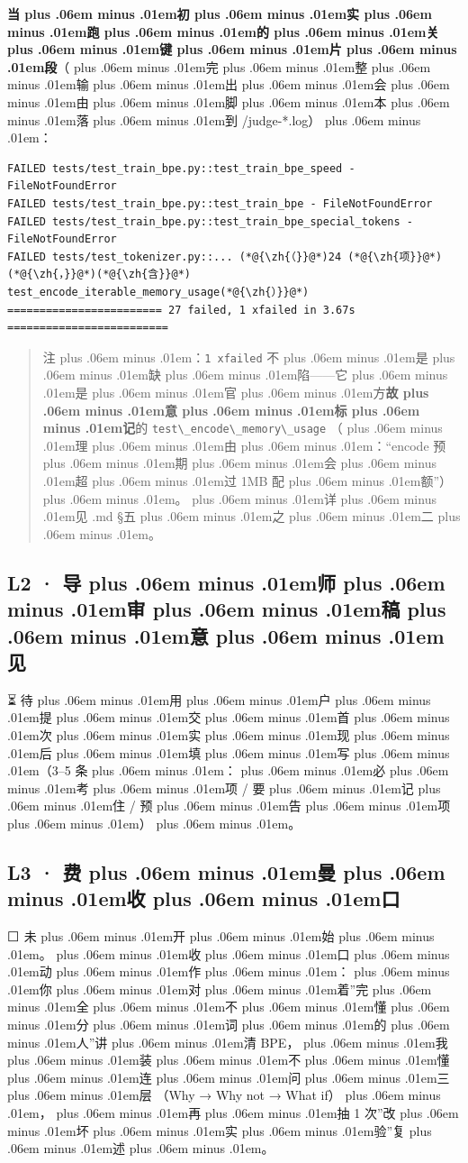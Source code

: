 \documentclass[
]{article}
\newcommand{\passthrough}[1]{#1}
\def\zh#1{{\zhfont #1}}
\def\sym#1{{\symfont #1}}
\def\emo#1{{\emofont #1}}
\def\codezh#1{{\zhmonofont #1}}
\def\zhglue{\hskip0pt plus .06em minus .01em}
\begin{document}
\textbf{\zh{当\zhglue 初\zhglue 实\zhglue 跑\zhglue 的\zhglue 关\zhglue 键\zhglue 片\zhglue 段}}\zh{（\zhglue 完\zhglue 整\zhglue 输\zhglue 出\zhglue 会\zhglue 由\zhglue 脚\zhglue 本\zhglue 落\zhglue 到} \passthrough{\codezh{{\zh{证}}{\zh{据}}/judge-*.log}}\zh{）\zhglue ：}

\begin{lstlisting}
FAILED tests/test_train_bpe.py::test_train_bpe_speed - FileNotFoundError
FAILED tests/test_train_bpe.py::test_train_bpe - FileNotFoundError
FAILED tests/test_train_bpe.py::test_train_bpe_special_tokens - FileNotFoundError
FAILED tests/test_tokenizer.py::... (*@{\zh{（}}@*)24 (*@{\zh{项}}@*)(*@{\zh{，}}@*)(*@{\zh{含}}@*) test_encode_iterable_memory_usage(*@{\zh{）}}@*)
======================== 27 failed, 1 xfailed in 3.67s =========================
\end{lstlisting}

\begin{quote}
\zh{注\zhglue ：}\passthrough{\lstinline!1 xfailed!} \zh{不\zhglue 是\zhglue 缺\zhglue 陷}------\zh{它\zhglue 是\zhglue 官\zhglue 方}\textbf{\zh{故\zhglue 意\zhglue 标\zhglue 记}}\zh{的} \passthrough{\lstinline!test\_encode\_memory\_usage!} \zh{（\zhglue 理\zhglue 由\zhglue ：}``encode \zh{预\zhglue 期\zhglue 会\zhglue 超\zhglue 过} 1MB \zh{配\zhglue 额}''\zh{）\zhglue 。\zhglue 详\zhglue 见} \passthrough{\codezh{{\zh{开}}{\zh{题}}{\zh{简}}{\zh{报}}.md}} \sym{§}\zh{五\zhglue 之\zhglue 二\zhglue 。}
\end{quote}

\subsection{L2 \sym{·} \zh{导\zhglue 师\zhglue 审\zhglue 稿\zhglue 意\zhglue 见}}\label{l2-ux5bfcux5e08ux5ba1ux7a3fux610fux89c1}

\emo{⏳} \zh{待\zhglue 用\zhglue 户\zhglue 提\zhglue 交\zhglue 首\zhglue 次\zhglue 实\zhglue 现\zhglue 后\zhglue 填\zhglue 写\zhglue （}3--5 \zh{条\zhglue ：\zhglue 必\zhglue 考\zhglue 项} / \zh{要\zhglue 记\zhglue 住} / \zh{预\zhglue 告\zhglue 项\zhglue ）\zhglue 。}

\subsection{L3 \sym{·} \zh{费\zhglue 曼\zhglue 收\zhglue 口}}\label{l3-ux8d39ux66fcux6536ux53e3}

\emo{⬜} \zh{未\zhglue 开\zhglue 始\zhglue 。\zhglue 收\zhglue 口\zhglue 动\zhglue 作\zhglue ：\zhglue 你\zhglue 对\zhglue 着}''\zh{完\zhglue 全\zhglue 不\zhglue 懂\zhglue 分\zhglue 词\zhglue 的\zhglue 人}''\zh{讲\zhglue 清} BPE\zh{，\zhglue 我\zhglue 装\zhglue 不\zhglue 懂\zhglue 连\zhglue 问\zhglue 三\zhglue 层} \zh{（}Why \sym{→} Why not \sym{→} What if\zh{）\zhglue ，\zhglue 再\zhglue 抽} 1 \zh{次}''\zh{改\zhglue 坏\zhglue 实\zhglue 验}''\zh{复\zhglue 述\zhglue 。}
\end{document}
